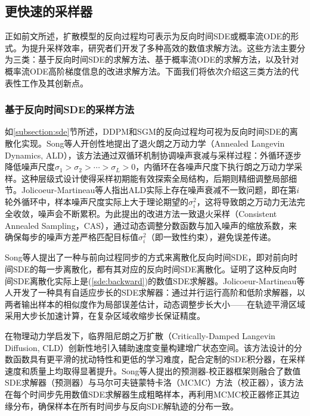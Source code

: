 \documentclass[11pt,a4paper,UTF8]{ctexart}
\begin{document}
\subsection{更快速的采样器}

正如前文所述，扩散模型的反向过程均可表示为反向时间SDE或概率流ODE的形式。为提升采样效率，研究者们开发了多种高效的数值求解方法。这些方法主要分为三类：基于反向时间SDE的求解方法、基于概率流ODE的求解方法，以及针对概率流ODE高阶梯度信息的改进求解方法。下面我们将依次介绍这三类方法的代表性工作及其创新点。

\subsubsection{基于反向时间SDE的采样方法}

如\ref{subsection:sde}节所述，DDPM和SGM的反向过程均可视为反向时间SDE的离散化实现。Song等人\cite{song2019generative}开创性地提出了退火朗之万动力学（Annealed Langevin Dynamics, ALD），该方法通过双循环机制协调噪声衰减与采样过程：外循环逐步降低噪声尺度$\sigma_1>\sigma_2>\cdots>\sigma_L>0$，内循环在各噪声尺度下执行朗之万动力学采样。这种层级式设计使得采样初期能有效探索全局结构，后期则精细调整局部细节。Jolicoeur-Martineau等人\cite{JolicoeurMartineau2021AdversarialSM}指出ALD实际上存在噪声衰减不一致问题，即在第$i$轮外循环中，样本噪声尺度实际上大于理论期望的$\sigma_i^2$，这将导致朗之万动力无法完全收敛，噪声会不断累积。为此提出的改进方法一致退火采样（Consistent Annealed Sampling，CAS），通过动态调整分数函数与加入噪声的缩放系数，来确保每步的噪声方差严格匹配目标值$\sigma_i^2$（即一致性约束），避免误差传递。

Song等人\cite{song2020score}提出了一种与前向过程同步的方式来离散化反向时间SDE，即对前向时间SDE的每一步离散化，都有其对应的反向时间SDE离散化。\cite{song2020score}证明了这种反向时间SDE离散化实际上是(\ref{sde:backward})的数值SDE求解器。Jolicoeur-Martineau等人\cite{jolicoeur2021gotta}开发了一种具有自适应步长的SDE求解器：通过并行运行高阶和低阶求解器，以两者输出样本的相似度作为局部误差估计，动态调整步长大小——在轨迹平滑区域采用大步长加速计算，在复杂区域收缩步长保证精度。

在物理动力学启发下，临界阻尼朗之万扩散（Critically-Damped Langevin Diffusion, CLD）\cite{dockhorn2021score}创新性地引入辅助速度变量构建增广状态空间。该方法设计的分数函数具有更平滑的扰动特性和更低的学习难度，配合定制的SDE积分器，在采样速度和质量上均取得显著提升。Song等人\cite{song2020score}提出的预测器-校正器框架则融合了数值SDE求解器（预测器）与马尔可夫链蒙特卡洛（MCMC）方法（校正器），该方法在每个时间步先用数值SDE求解器生成粗略样本，再利用MCMC校正器修正其边缘分布，确保样本在所有时间步与反向SDE解轨迹的分布一致。
\end{document}
